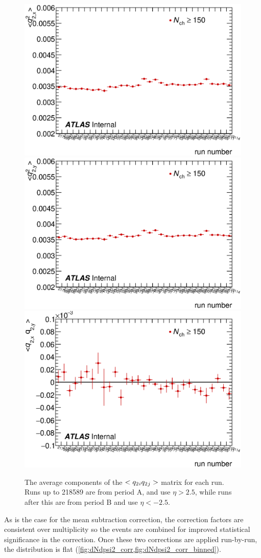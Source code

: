 \begin{figure}[t]
\centering
\includegraphics[width=.49\linewidth]{can_qxx.eps}
\includegraphics[width=.49\linewidth]{can_qyy.eps}\\
\includegraphics[width=.49\linewidth]{can_qxy.eps}
\caption{The average components of the $<q_{2}{}_i q_{2}{}_j>$ matrix for each run. Runs up to 218589 are from period A, and use $\eta > 2.5$, while runs after this are from period B and use $\eta < -2.5$.}
\label{fig:mean_q2_cov}
\end{figure}

As is the case for the mean subtraction correction, the correction factors are consistent over multiplicity so the events are combined for improved statistical significance in the correction.
Once these two corrections are applied run-by-run, the \psit distribution is flat (\cref{fig:dNdpsi2_corr,fig:dNdpsi2_corr_binned}).

